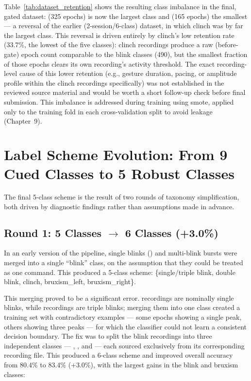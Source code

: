 Table~\ref{tab:dataset_retention} shows the resulting class
imbalance in the final, gated dataset: 
(325 epochs) is now the largest class and  (165
epochs) the smallest --- a reversal of the earlier
(2-session/6-class) dataset, in which clinch was by far the
largest class. This reversal is driven entirely by clinch's low
retention rate (33.7\%, the lowest of the five classes): clinch
recordings produce a raw (before-gate) epoch count comparable to
the blink classes (490), but the smallest fraction of those
epochs clears its own recording's activity threshold. The exact
recording-level cause of this lower retention (e.g., gesture
duration, pacing, or amplitude profile within the clinch
recordings specifically) was not established in the reviewed
source material and would be worth a short follow-up check
before final submission. This imbalance is addressed during
training using \acrshort{smote}, applied only to the training
fold in each cross-validation split to avoid leakage (Chapter~9).

\section{Label Scheme Evolution: From 9 Cued Classes to 5 Robust Classes}
\label{sec:dc_labels}

The final 5-class scheme is the result of two rounds of taxonomy
simplification, both driven by diagnostic findings rather than
assumptions made in advance.

\subsection{Round 1: 5 Classes $\rightarrow$ 6 Classes (+3.0\%)}

In an early version of the pipeline, single blinks
() and multi-blink bursts were merged into a
single ``blink'' class, on the assumption that they could be
treated as one command. This produced a 5-class scheme:
\{single/triple blink, double blink, clinch, bruxism\_left,
bruxism\_right\}.

This merging proved to be a significant error. 
recordings are nominally single blinks, while 
recordings are triple blinks; merging them into one class
created a training set with contradictory examples --- some
epochs showing a single peak, others showing three peaks --- for
which the classifier could not learn a consistent decision
boundary. The fix was to split the blink recordings into three
independent classes --- , ,
and  --- each sourced exclusively from its
corresponding recording file. This produced a 6-class scheme and
improved overall accuracy from 80.4\% to 83.4\% (+3.0\%), with
the largest gains in the blink and bruxism classes:

